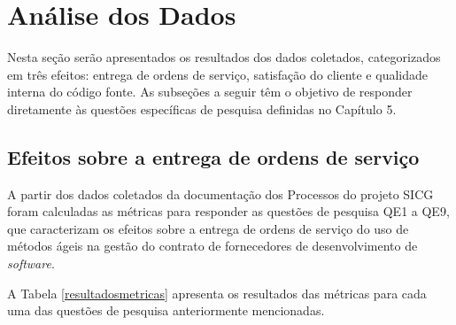 \section[Análise dos Dados]{Análise dos Dados}

Nesta seção serão apresentados os resultados dos dados coletados, categorizados em três efeitos: entrega de ordens de serviço, satisfação do cliente e qualidade interna do código fonte. As subseções a seguir têm o objetivo de responder diretamente às questões específicas de pesquisa definidas no Capítulo 5.

\subsection[Efeitos sobre a entrega de ordens de serviço]{Efeitos sobre a entrega de ordens de serviço}

A partir dos dados coletados da documentação dos Processos do projeto SICG foram calculadas as métricas para responder as questões de pesquisa QE1 a QE9, que caracterizam os efeitos sobre a entrega de ordens de serviço do uso de métodos ágeis na gestão do contrato de fornecedores de desenvolvimento de \textit{software}.

A Tabela \ref{resultadosmetricas} apresenta os resultados das métricas para cada uma das questões de pesquisa anteriormente mencionadas.

